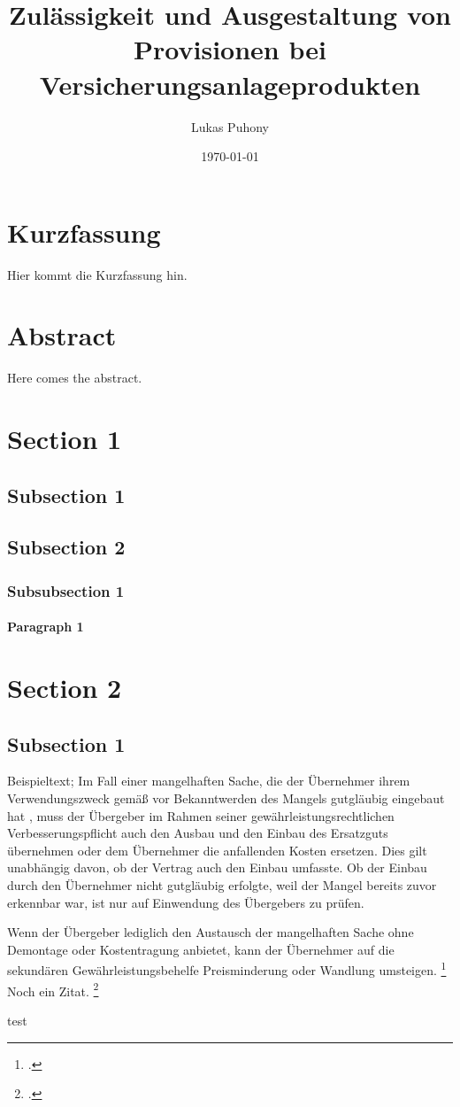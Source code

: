 \documentclass[a4paper, 12pt]{article}
\title{Zulässigkeit und Ausgestaltung von Provisionen bei Versicherungsanlageprodukten}
\author{Lukas Puhony}
\date{\today}
\begin{document}


\section*{Kurzfassung}

Hier kommt die Kurzfassung hin.

\newpage

\section*{Abstract}

Here comes the abstract.

\newpage
{}

\tableofcontents
\newpage

\section{Section 1}
\subsection{Subsection 1}
\subsection{Subsection 2}
\subsubsection{Subsubsection 1}
\paragraph{Paragraph 1}

\section{Section 2}
\subsection{Subsection 1}

Beispieltext; Im Fall einer mangelhaften Sache, die der Übernehmer ihrem Verwendungszweck gemäß vor Bekanntwerden des Mangels gutgläubig eingebaut hat , muss der Übergeber im Rahmen seiner gewährleistungsrechtlichen Verbesserungspflicht  auch den Ausbau und den Einbau des Ersatzguts übernehmen oder dem Übernehmer die anfallenden Kosten ersetzen. Dies gilt unabhängig davon, ob der Vertrag auch den Einbau umfasste. Ob der Einbau durch den Übernehmer nicht gutgläubig erfolgte, weil der Mangel bereits zuvor erkennbar war, ist nur auf Einwendung des Übergebers zu prüfen.

Wenn der Übergeber lediglich den Austausch der mangelhaften Sache ohne Demontage oder Kostentragung anbietet, kann der Übernehmer auf die sekundären Gewährleistungsbehelfe Preisminderung oder Wandlung umsteigen. \footcite[20]{sonnberger2023} Noch ein Zitat. \footcite[22]{sonnberger2023}

test

\newpage
\nocite{*}
\printbibliography
\end{document}

